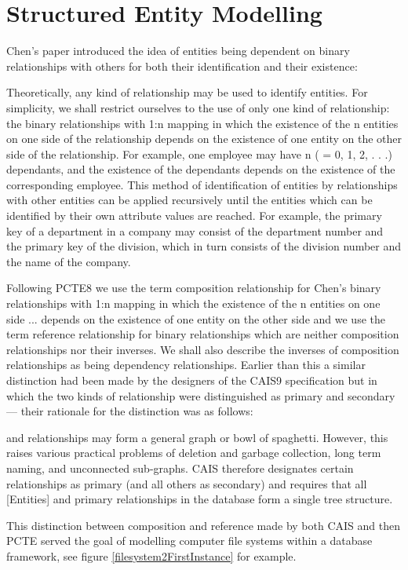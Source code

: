 \section{Structured Entity Modelling}
\label{StructuredEntityModelling}
Chen's paper introduced the idea of entities being dependent on binary relationships with others for both their identification and their existence:
\begin{erquote}
Theoretically, any kind of relationship may be used to identify entities. For simplicity, we shall restrict ourselves to the use of only one kind of relationship: the binary relationships with 1:n mapping in which the existence of the n entities on one side of the relationship depends on the existence of one entity on the other side of the relationship. For example, one employee may have n ( = 0, 1, 2, . . .) dependants, and the existence of the dependants depends on the existence of the corresponding employee. This method of identification of entities by relationships with other entities can be applied recursively until the entities which can be identified by their own attribute values are reached. For example, the primary key of a department in a company may consist of the department number and the primary key of the division, which in turn consists of the division number and the name of the company.
\end{erquote}

Following PCTE8 we use the term composition relationship for Chen's binary relationships with 1:n mapping in which the existence of the n entities on one side ... depends on the existence of one entity on the other side and we use the term reference relationship for binary relationships which are neither composition relationships nor their inverses. We shall also describe the inverses of composition relationships as being dependency relationships. Earlier than this a similar distinction had been made by the designers of the CAIS9 specification but in which the two kinds of relationship were distinguished as primary and secondary — their rationale for the distinction was as follows:
\begin{erquote}
[Entities] and relationships may form a general graph or bowl of spaghetti. However, this raises various practical problems of deletion and garbage collection, long term naming, and unconnected sub-graphs. CAIS therefore designates certain relationships as primary (and all others as secondary) and requires that all [Entities] and primary relationships in the database form a single tree structure.
\end{erquote}
This distinction between composition and reference made by both CAIS and then PCTE served the goal of modelling computer file systems within a database framework, see figure \ref{filesystem2FirstInstance} for example.

